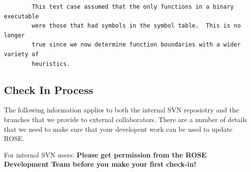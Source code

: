 \begin{enumerate}
{\begin{verbatim}
        This test case assumed that the only functions in a binary executable
        were those that had symbols in the symbol table.  This is no longer
        true since we now determine function boundaries with a wider variety of
        heuristics.
        \end{verbatim} 
    }
  \end{enumerate}


    \subsection{Check In Process}

  The following information applies to both the internal SVN reposiotry and the 
    branches that we provide to external collaborators.  There are a number of details
    that we need to make sure that your developent work can be used to update ROSE.

    For internal SVN users:
    {\bf Please get permission from the ROSE Development Team before you make your first check-in!}

